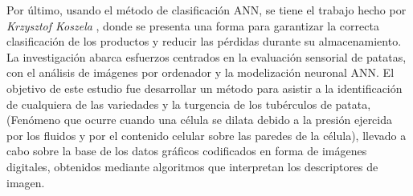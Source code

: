 	Por último, usando el método de clasificación ANN, se tiene el trabajo hecho por \textit{Krzysztof Koszela} \cite{Przybyl2019}, donde se presenta una forma para garantizar la correcta clasificación de los productos y reducir las pérdidas durante su almacenamiento. La investigación abarca esfuerzos centrados en la evaluación sensorial de patatas, con el análisis de imágenes por ordenador y la modelización neuronal ANN. El objetivo de este estudio fue desarrollar un método para asistir a la identificación de cualquiera de las variedades y la turgencia de los tubérculos de patata, (Fenómeno que ocurre cuando una célula se dilata debido a la presión ejercida por los fluidos y por el contenido celular sobre las paredes de la célula), llevado a cabo sobre la base de los datos gráficos codificados en forma de imágenes digitales, obtenidos mediante algoritmos que interpretan los descriptores de imagen.\\

